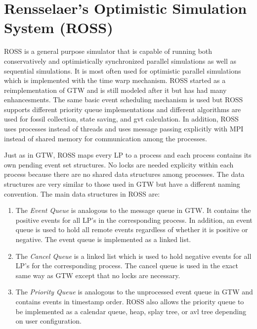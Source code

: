 \documentclass[11pt]{book}
\begin{document}
\section{Rensselaer's Optimistic Simulation System (ROSS)}

ROSS\cite{carothers-00} is a general purpose simulator that is capable of running both
conservatively and optimistically synchronized parallel simulations as well as sequential
simulations. It is most often used for optimistic parallel simulations which is implemented
with the time warp mechanism. ROSS started as a reimplementation of GTW and is still
modeled after it but has had many enhancesments. The same basic event scheduling mechanism is
used but ROSS supports different priority queue implementations and different algorithms
are used for fossil collection, state saving, and gvt calculation. In addition, ROSS uses
processes instead of threads and uses message passing explicitly with MPI instead of shared
memory for communication among the processes.

Just as in GTW, ROSS maps every LP to a process and each process contains its own pending
event set structures. No locks are needed explicity within each process because there are
no shared data structures among processes. The data structures are very similar to those
used in GTW but have a different naming convention. The main data structures in ROSS are:

\begin{enumerate}
    \item The \emph{Event Queue} is analogous to the message queue in GTW. It contains the
        positive events for all LP's in the corresponding process. In addition, an event
        queue is used to hold all remote events regardless of whether it is positive or
        negative. The event queue is implemented as a linked list.
    \item The \emph{Cancel Queue} is a linked list which is used to hold negative events
        for all LP's for the corresponding process. The cancel queue is used in the exact
        same way as GTW except that no locks are necessary.
    \item The \emph{Priority Queue} is analogous to the unprocessed event queue in GTW and
        contains events in timestamp order. ROSS also allows the priority queue to be
        implemented as a calendar queue, heap, splay tree, or avl tree depending on user
        configuration.
\end{enumerate}
\end{document}
